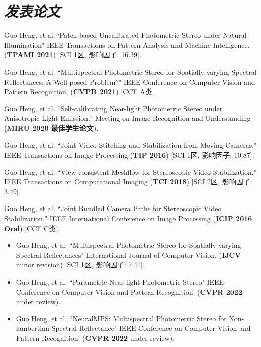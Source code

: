\documentclass[UTF8]{ctexart}
\begin{document}
	\section{\textit{\textbf{发表论文}}}
	\begin{enumerate}[label={[\arabic*]}]
		\item Guo Heng, et al. `Patch-based Uncalibrated Photometric Stereo under Natural Illumination" 
		IEEE Transactions on Pattern Analysis and Machine Intelligence. (\textbf{TPAMI 2021}) [SCI 1区, 影响因子: 16.39]. 
		\item Guo Heng, et al. ``Multispectral Photometric Stereo for Spatially-varying Spectral Reflectances: A Well-posed Problem?" IEEE Conference on Computer Vision and Pattern Recognition. (\textbf{CVPR 2021}) [CCF A类]. 
		\item Guo Heng, et al. ``Self-calibrating Near-light Photometric Stereo under Anisotropic Light Emission." Meeting on Image Recognition and Understanding (\textbf{MIRU 2020 最佳学生论文}).  
		\item Guo Heng, et al. ``Joint Video Stitching and Stabilization from Moving Cameras." IEEE Transactions on Image Processing (\textbf{TIP 2016}) [SCI 1区, 影响因子: 10.87].
		\item Guo Heng, et al. ``View-consistent Meshflow for Stereoscopic Video Stabilization." IEEE Transactions on Computational Imaging (\textbf{TCI 2018}) [SCI 2区, 影响因子: 3.49].
		\item Guo Heng, et al. ``Joint Bundled Camera Paths for Stereoscopic Video Stabilization." IEEE International Conference on Image Processing (\textbf{ICIP 2016 Oral}) [CCF C类].
	\end{enumerate}
	\begin{itemize}[label={[*]}]
		\item Guo Heng, et al. ``Multispectral Photometric Stereo for Spatially-varying Spectral Reflectances" International Journal of Computer Vision. (\textbf{IJCV} minor revision) [SCI 1区, 影响因子: 7.41]. 
		\item Guo Heng, et al. ``Parametric Near-light Photometric Stereo" IEEE Conference on Computer Vision and Pattern Recognition. (\textbf{CVPR 2022} under review). 
		\item Guo Heng, et al. ``NeuralMPS: Multispectral Photometric Stereo for Non-lambertian Spectral Reflectance" IEEE Conference on Computer Vision and Pattern Recognition. (\textbf{CVPR 2022} under review). 
	\end{itemize}
	
	
	
\end{document}
